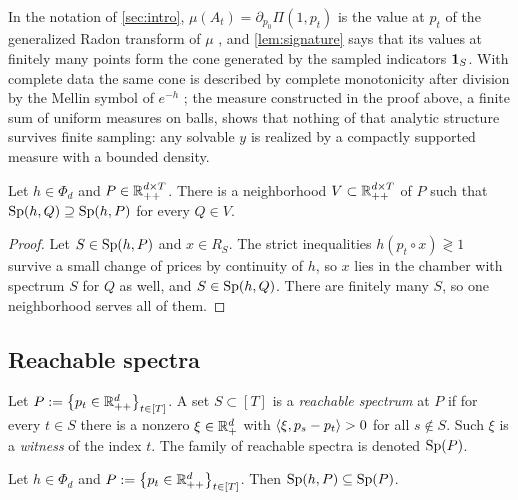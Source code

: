 \begin{remark}\label{rem:radon}
In the notation of \cref{sec:intro}, $\mu(A_t)=\partial_{p_0}\Pi(1,p_t)$ is the value at $p_t$ of the generalized Radon transform of $\mu$ \citep{Agaltsov2016}, and \cref{lem:signature} says that its values at finitely many points form the cone generated by the sampled indicators $\ind S$. With complete data the same cone is described by complete monotonicity after division by the Mellin symbol of $e^{-h}$ \citep{Agaltsov2015}; the measure constructed in the proof above, a finite sum of uniform measures on balls, shows that nothing of that analytic structure survives finite sampling: any solvable $y$ is realized by a compactly supported measure with a bounded density.
\end{remark}

\begin{lemma}[stability]\label{lem:stability}
Let $h\in\Phi_d$ and $P\in\Rpp[d\times T]$. There is a neighborhood $V\subset\Rpp[d\times T]$ of $P$ such that $\Sp(h,Q)\supseteq\Sp(h,P)$ for every $Q\in V$.
\end{lemma}

\begin{proof}
Let $S\in\Sp(h,P)$ and $x\in R_S$. The strict inequalities $h(p_t\circ x)\gtrless1$ survive a small change of prices by continuity of $h$, so $x$ lies in the chamber with spectrum $S$ for $Q$ as well, and $S\in\Sp(h,Q)$. There are finitely many $S$, so one neighborhood serves all of them.
\end{proof}

\subsection{Reachable spectra}

\begin{definition}\label{def:reachable}
Let $P:=\set{p_t\in\Rpp[d]}_{t\in[T]}$. A set $S\subset[T]$ is a \emph{reachable spectrum} at $P$ if for every $t\in S$ there is a nonzero $\xi\in\Rp[d]$ with $\ip{\xi}{p_s-p_t}>0$ for all $s\notin S$. Such $\xi$ is a \emph{witness} of the index $t$. The family of reachable spectra is denoted $\Sp(P)$.
\end{definition}

\begin{lemma}[necessity]\label{lem:necessity}
Let $h\in\Phi_d$ and $P:=\set{p_t\in\Rpp[d]}_{t\in[T]}$. Then $\Sp(h,P)\subseteq\Sp(P)$.
\end{lemma}

